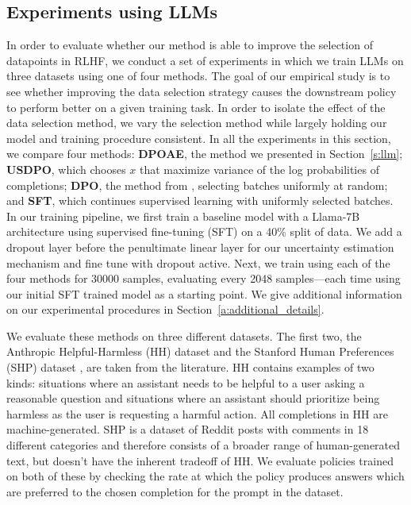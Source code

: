 \documentclass{article} \usepackage{iclr2023_conference,times}
\begin{document}
 \subsection{Experiments using LLMs}
In order to evaluate whether our method is able to improve the selection of datapoints in RLHF, we conduct a set of experiments in which we train LLMs on three datasets using one of four methods. The goal of our empirical study is to see whether improving the data selection strategy causes the downstream policy to perform better on a given training task. In order to isolate the effect of the data selection method, we vary the selection method while largely holding our model and training procedure consistent.
In all the experiments in this section, we compare four methods: \textbf{DPOAE}, the method we presented in Section~\ref{s:llm}; \textbf{USDPO}, which chooses $x$ that maximize variance of the log probabilities of completions; \textbf{DPO}, the method from \citet{dpo}, selecting batches uniformly at random; and \textbf{SFT}, which continues supervised learning with uniformly selected batches.
In our training pipeline, we first train a baseline model with a Llama-7B \citep{llama} architecture using supervised fine-tuning (SFT) on a 40\% split of data.
We add a dropout layer before the penultimate linear layer for our uncertainty estimation mechanism and fine tune with dropout active.
Next, we train using each of the four methods for 30000 samples, evaluating every 2048 samples---each time using our initial SFT trained model as a starting point. We give additional information on our experimental procedures in Section~\ref{a:additional_details}.



We evaluate these methods on three different datasets.
The first two, the Anthropic Helpful-Harmless (HH) dataset \citep{bai2022training} and the Stanford Human Preferences (SHP) dataset \citep{pmlr-v162-ethayarajh22a}, are taken from the  literature.
HH contains examples of two kinds: situations where an assistant needs to be helpful to a user asking a reasonable question and situations where an assistant should prioritize being harmless as the user is requesting a harmful action. All completions in HH are machine-generated. SHP is a dataset of Reddit posts with comments in 18 different categories and therefore consists of a broader range of human-generated text, but doesn't have the inherent tradeoff of HH.
We evaluate policies trained on both of these by checking the rate at which the policy produces answers which are preferred to the chosen completion for the prompt in the dataset.
\end{document}
